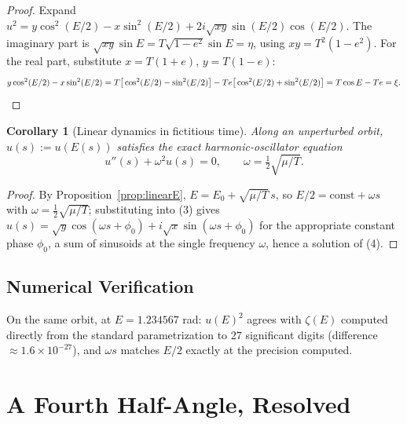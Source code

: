 \documentclass[12pt]{amsart}
\theoremstyle{plain}
\newtheorem{corollary}[theorem]{Corollary}
\theoremstyle{remark}
\begin{document}
\begin{proof}
Expand $u^2=y\cos^2(E/2)-x\sin^2(E/2)+2i\sqrt{xy}\sin(E/2)\cos(E/2)$. The imaginary part is $\sqrt{xy}\sin E=T\sqrt{1-e^2}\sin E=\eta$, using $xy=T^2(1-e^2)$. For the real part, substitute $x=T(1+e)$, $y=T(1-e)$:
\[
y\cos^2(E/2)-x\sin^2(E/2)=T\big[\cos^2(E/2)-\sin^2(E/2)\big]-Te\big[\cos^2(E/2)+\sin^2(E/2)\big]=T\cos E-Te=\xi. \qedhere
\]
\end{proof}

\begin{corollary}[Linear dynamics in fictitious time]\label{cor:oscillator}
Along an unperturbed orbit, $u(s):=u(E(s))$ satisfies the exact harmonic-oscillator equation
\begin{equation}
u''(s)+\omega^2 u(s)=0, \qquad \omega=\tfrac12\sqrt{\mu/T}. \tag{4}
\end{equation}
\end{corollary}

\begin{proof}
By Proposition~\ref{prop:linearE}, $E=E_0+\sqrt{\mu/T}\,s$, so $E/2=\text{const}+\omega s$ with $\omega=\tfrac12\sqrt{\mu/T}$; substituting into (3) gives $u(s)=\sqrt y\cos(\omega s+\phi_0)+i\sqrt x\sin(\omega s+\phi_0)$ for the appropriate constant phase $\phi_0$, a sum of sinusoids at the single frequency $\omega$, hence a solution of (4). \qedhere
\end{proof}

\subsection*{Numerical Verification}

On the same orbit, at $E=1.234567$ rad: $u(E)^2$ agrees with $\zeta(E)$ computed directly from the standard parametrization to $27$ significant digits (difference $\approx1.6\times10^{-27}$), and $\omega s$ matches $E/2$ exactly at the precision computed.

\section{A Fourth Half-Angle, Resolved}
\end{document}
